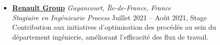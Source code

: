 \documentclass[a4paper,10pt]{article}
\begin{document}
\begin{itemize}[leftmargin=*]
\begin{itemize}[leftmargin=*]
\item
  \textbf{\href{https://www.renaultgroup.com/}{Renault Group}} \hfill \emph{Guyancourt, Île-de-France, France} \\
  \emph{Stagiaire en Ingénieurie Process} \hfill Juillet 2021 – Août 2021, Stage \\
  Contribution aux initiatives d’optimisation des procédés au sein du département ingénierie, améliorant l’efficacité des flux de travail.

    
\end{itemize}

\end{itemize}
\end{document}
